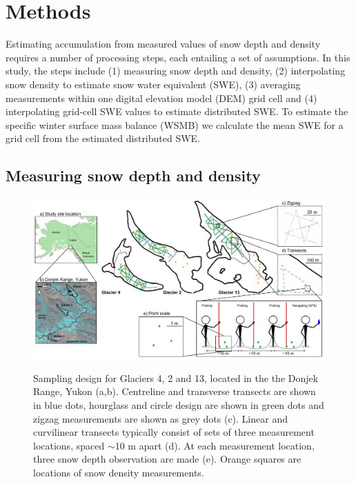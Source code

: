 \documentclass[twocolumn,letterpaper]{igs}
\begin{document}


\section{Methods}

Estimating accumulation from measured values of snow depth and density requires a number of processing steps, each entailing a set of assumptions.  In this study, the steps include (1) measuring snow depth and density, (2) interpolating snow density to estimate snow water equivalent (SWE), (3) averaging measurements within one digital elevation model (DEM) grid cell and (4) interpolating grid-cell SWE values to estimate distributed SWE. To estimate the specific winter surface mass balance (WSMB) we calculate the mean SWE for a grid cell from the estimated distributed SWE. 

\subsection{Measuring snow depth and density}

\begin{figure}
	\centering
	\includegraphics[width =\textwidth]{Sampling.pdf}\\
	\caption{Sampling design for Glaciers 4, 2 and 13, located in the the Donjek Range, Yukon (a,b). Centreline and transverse transects are shown in blue dots, hourglass and circle design are shown in green dots and zigzag measurements are shown as grey dots (c). Linear and curvilinear transects typically consist of sets of three measurement locations, spaced $\sim$10 m apart (d). At each measurement location, three snow depth observation are made (e). Orange squares are locations of snow density measurements. }
	\label{fig:Sampling}
\end{figure}
\end{document}
